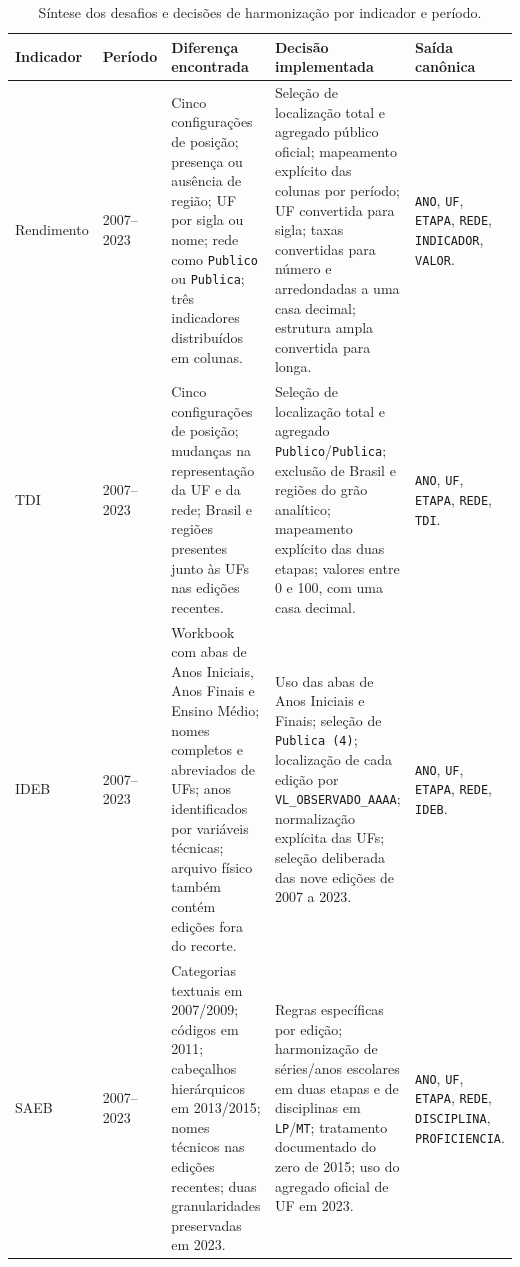 \begin{landscape}
\begin{table}[H]
\centering
\scriptsize
\caption{Síntese dos desafios e decisões de harmonização por indicador e período.}
\label{tab:sintese-harmonizacao}
\renewcommand{\arraystretch}{1.18}
\begin{tabular}{|p{2.1cm}|p{2.4cm}|p{6.0cm}|p{6.2cm}|p{5.0cm}|}
\hline
\textbf{Indicador} & \textbf{Período} & \textbf{Diferença encontrada} & \textbf{Decisão implementada} & \textbf{Saída canônica} \\ \hline
Rendimento & 2007--2023 & Cinco configurações de posição; presença ou ausência de região; UF por sigla ou nome; rede como \texttt{Publico} ou \texttt{Publica}; três indicadores distribuídos em colunas. & Seleção de localização total e agregado público oficial; mapeamento explícito das colunas por período; UF convertida para sigla; taxas convertidas para número e arredondadas a uma casa decimal; estrutura ampla convertida para longa. & \texttt{ANO}, \texttt{UF}, \texttt{ETAPA}, \texttt{REDE}, \texttt{INDICADOR}, \texttt{VALOR}. \\ \hline
TDI & 2007--2023 & Cinco configurações de posição; mudanças na representação da UF e da rede; Brasil e regiões presentes junto às UFs nas edições recentes. & Seleção de localização total e agregado \texttt{Publico}/\texttt{Publica}; exclusão de Brasil e regiões do grão analítico; mapeamento explícito das duas etapas; valores entre 0 e 100, com uma casa decimal. & \texttt{ANO}, \texttt{UF}, \texttt{ETAPA}, \texttt{REDE}, \texttt{TDI}. \\ \hline
IDEB & 2007--2023 & Workbook com abas de Anos Iniciais, Anos Finais e Ensino Médio; nomes completos e abreviados de UFs; anos identificados por variáveis técnicas; arquivo físico também contém edições fora do recorte. & Uso das abas de Anos Iniciais e Finais; seleção de \texttt{Publica (4)}; localização de cada edição por \texttt{VL\_OBSERVADO\_AAAA}; normalização explícita das UFs; seleção deliberada das nove edições de 2007 a 2023. & \texttt{ANO}, \texttt{UF}, \texttt{ETAPA}, \texttt{REDE}, \texttt{IDEB}. \\ \hline
SAEB & 2007--2023 & Categorias textuais em 2007/2009; códigos em 2011; cabeçalhos hierárquicos em 2013/2015; nomes técnicos nas edições recentes; duas granularidades preservadas em 2023. & Regras específicas por edição; harmonização de séries/anos escolares em duas etapas e de disciplinas em \texttt{LP}/\texttt{MT}; tratamento documentado do zero de 2015; uso do agregado oficial de UF em 2023. & \texttt{ANO}, \texttt{UF}, \texttt{ETAPA}, \texttt{REDE}, \texttt{DISCIPLINA}, \texttt{PROFICIENCIA}. \\ \hline

\end{tabular}
\end{table}
\end{landscape}
